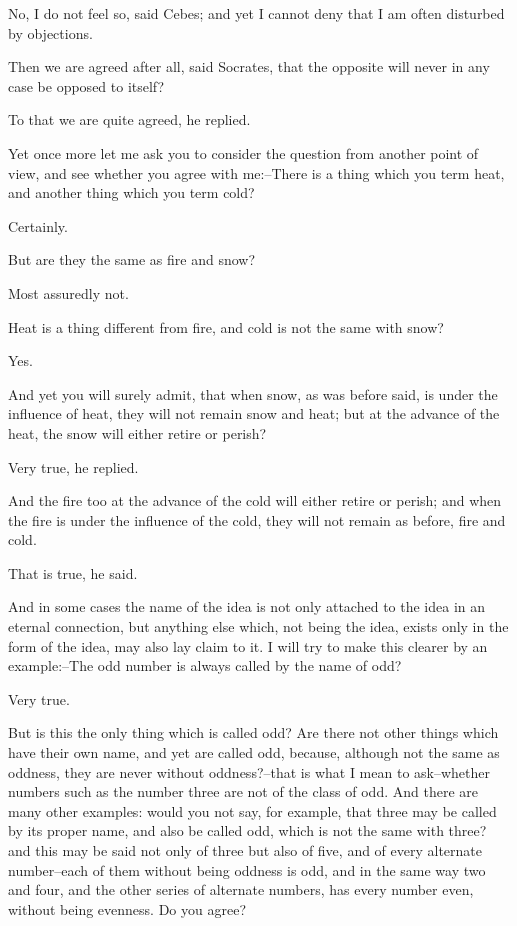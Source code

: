 No, I do not feel so, said Cebes; and yet I cannot deny that I am often
disturbed by objections.

Then we are agreed after all, said Socrates, that the opposite will
never in any case be opposed to itself?

To that we are quite agreed, he replied.

Yet once more let me ask you to consider the question from another point
of view, and see whether you agree with me:--There is a thing which you
term heat, and another thing which you term cold?

Certainly.

But are they the same as fire and snow?

Most assuredly not.

Heat is a thing different from fire, and cold is not the same with snow?

Yes.

And yet you will surely admit, that when snow, as was before said, is
under the influence of heat, they will not remain snow and heat; but at
the advance of the heat, the snow will either retire or perish?

Very true, he replied.

And the fire too at the advance of the cold will either retire or
perish; and when the fire is under the influence of the cold, they will
not remain as before, fire and cold.

That is true, he said.

And in some cases the name of the idea is not only attached to the idea
in an eternal connection, but anything else which, not being the idea,
exists only in the form of the idea, may also lay claim to it. I will
try to make this clearer by an example:--The odd number is always called
by the name of odd?

Very true.

But is this the only thing which is called odd? Are there not other
things which have their own name, and yet are called odd, because,
although not the same as oddness, they are never without oddness?--that
is what I mean to ask--whether numbers such as the number three are not
of the class of odd. And there are many other examples: would you not
say, for example, that three may be called by its proper name, and also
be called odd, which is not the same with three? and this may be said
not only of three but also of five, and of every alternate number--each
of them without being oddness is odd, and in the same way two and
four, and the other series of alternate numbers, has every number even,
without being evenness. Do you agree?

